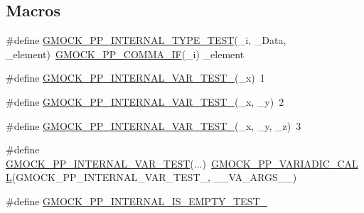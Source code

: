 \subsection*{Macros}
\begin{DoxyCompactItemize}
\item 
\#define \mbox{\hyperlink{_obj__test_2lib_2googletest-master_2googlemock_2test_2gmock-pp__test_8cc_add9a565fd01a36e8fc77005ff7ddee44}{G\+M\+O\+C\+K\+\_\+\+P\+P\+\_\+\+I\+N\+T\+E\+R\+N\+A\+L\+\_\+\+T\+Y\+P\+E\+\_\+\+T\+E\+ST}}(\+\_\+i,  \+\_\+\+Data,  \+\_\+element)~\mbox{\hyperlink{_obj__test_2lib_2googletest-master_2googlemock_2include_2gmock_2internal_2gmock-pp_8h_acad3f789b483c40204f25a56c3342103}{G\+M\+O\+C\+K\+\_\+\+P\+P\+\_\+\+C\+O\+M\+M\+A\+\_\+\+IF}}(\+\_\+i) \+\_\+element
\item 
\#define \mbox{\hyperlink{_obj__test_2lib_2googletest-master_2googlemock_2test_2gmock-pp__test_8cc_af50bdb0dbcdac1eede87e5b261aef933}{G\+M\+O\+C\+K\+\_\+\+P\+P\+\_\+\+I\+N\+T\+E\+R\+N\+A\+L\+\_\+\+V\+A\+R\+\_\+\+T\+E\+S\+T\+\_}}(\+\_\+x)~1
\item 
\#define \mbox{\hyperlink{_obj__test_2lib_2googletest-master_2googlemock_2test_2gmock-pp__test_8cc_afad491ad91c52f7f8bad4ccd3448ce5b}{G\+M\+O\+C\+K\+\_\+\+P\+P\+\_\+\+I\+N\+T\+E\+R\+N\+A\+L\+\_\+\+V\+A\+R\+\_\+\+T\+E\+S\+T\+\_}}(\+\_\+x,  \+\_\+y)~2
\item 
\#define \mbox{\hyperlink{_obj__test_2lib_2googletest-master_2googlemock_2test_2gmock-pp__test_8cc_aea89cca718bf036fc3f1b10ab67019fb}{G\+M\+O\+C\+K\+\_\+\+P\+P\+\_\+\+I\+N\+T\+E\+R\+N\+A\+L\+\_\+\+V\+A\+R\+\_\+\+T\+E\+S\+T\+\_}}(\+\_\+x,  \+\_\+y,  \+\_\+z)~3
\item 
\#define \mbox{\hyperlink{_obj__test_2lib_2googletest-master_2googlemock_2test_2gmock-pp__test_8cc_af286893c080171240ce005160f017f65}{G\+M\+O\+C\+K\+\_\+\+P\+P\+\_\+\+I\+N\+T\+E\+R\+N\+A\+L\+\_\+\+V\+A\+R\+\_\+\+T\+E\+ST}}(...)~\mbox{\hyperlink{_obj__test_2lib_2googletest-master_2googlemock_2include_2gmock_2internal_2gmock-pp_8h_a4dd8715f753c7c3957f7185acf609e55}{G\+M\+O\+C\+K\+\_\+\+P\+P\+\_\+\+V\+A\+R\+I\+A\+D\+I\+C\+\_\+\+C\+A\+LL}}(G\+M\+O\+C\+K\+\_\+\+P\+P\+\_\+\+I\+N\+T\+E\+R\+N\+A\+L\+\_\+\+V\+A\+R\+\_\+\+T\+E\+S\+T\+\_\+, \+\_\+\+\_\+\+V\+A\+\_\+\+A\+R\+G\+S\+\_\+\+\_\+)
\item 
\#define \mbox{\hyperlink{_obj__test_2lib_2googletest-master_2googlemock_2test_2gmock-pp__test_8cc_ab8635d85cb91992914a106bb5c229829}{G\+M\+O\+C\+K\+\_\+\+P\+P\+\_\+\+I\+N\+T\+E\+R\+N\+A\+L\+\_\+\+I\+S\+\_\+\+E\+M\+P\+T\+Y\+\_\+\+T\+E\+S\+T\+\_}}
\end{DoxyCompactItemize}


